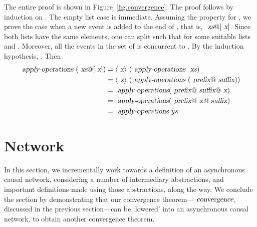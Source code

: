 \documentclass[acmlarge,review,anonymous]{acmart}\settopmatter{printfolios=true}
\begin{document}
The entire proof is shown in Figure~\ref{fig.convergence}.  The proof follows
by induction on . The empty list case is immediate. Assuming the
property for , we prove the case when a new event  is added to
the end of , that is, $\isa{xs}@[\isa{x}]$. Since both lists have the
same elements, one can split  such that  for
some suitable lists  and . Moreover, all the events in
the set of  is concurrent to . By the induction hypothesis,
. Then
\begin{align*}
  \isa{apply-operations}\ (\isa{xs}@[\isa{x}])
  &= \langle\isa{x}\rangle\ (\isa{apply-operations}\ \isa{xs}) \\
  &= \langle\isa{x}\rangle\ (\isa{apply-operations}\ (\isa{prefix}@\isa{suffix}))\\
  &= \isa{apply-operations} (\isa{prefix}@\isa{suffix}@\isa{x}) \\
  &= \isa{apply-operations} (\isa{prefix}@\isa{x@\isa{suffix}}) \\
  &= \isa{apply-operations}\ ys.
\end{align*}


\section{Network}
\label{sect.network}

In this section, we incrementally work towards a definition of an asynchronous causal network, considering a number of intermediary abstractions, and important definitions made using those abstractions, along the way.
We conclude the section by demonstrating that our convergence theorem---$\isa{convergence}$, discussed in the previous section---can be `lowered' into an asynchronous causal network, to obtain another convergence theorem.
\end{document}

